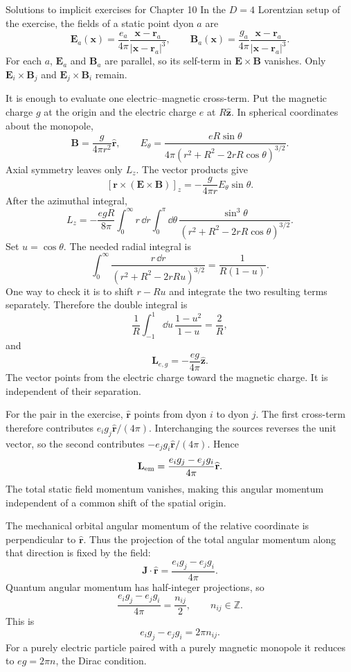 \begin{bankssolutions}{Solutions to implicit exercises for Chapter 10}
In the $D=4$ Lorentzian setup of the exercise, the fields of a static point
dyon $a$ are
\[
  \mathbf E_a(\mathbf x)=\frac{e_a}{4\pi}
  \frac{\mathbf x-\mathbf r_a}{|\mathbf x-\mathbf r_a|^3},
  \qquad
  \mathbf B_a(\mathbf x)=\frac{g_a}{4\pi}
  \frac{\mathbf x-\mathbf r_a}{|\mathbf x-\mathbf r_a|^3}.
\]
For each $a$, $\mathbf E_a$ and $\mathbf B_a$ are parallel, so its self-term
in $\mathbf E\times\mathbf B$ vanishes.  Only
$\mathbf E_i\times\mathbf B_j$ and
$\mathbf E_j\times\mathbf B_i$ remain.

It is enough to evaluate one electric--magnetic cross-term.  Put the magnetic
charge $g$ at the origin and the electric charge $e$ at
$R\widehat{\mathbf z}$.  In spherical coordinates about the monopole,
\[
  \mathbf B=\frac{g}{4\pi r^2}\widehat{\mathbf r},
  \qquad
  E_\theta=\frac{eR\sin\theta}{4\pi
  (r^2+R^2-2rR\cos\theta)^{3/2}}.
\]
Axial symmetry leaves only $L_z$.  The vector products give
\[
  [\mathbf r\times(\mathbf E\times\mathbf B)]_z
  =-\frac{g}{4\pi r}E_\theta\sin\theta.
\]
After the azimuthal integral,
\[
  L_z=-\frac{egR}{8\pi}
  \int_0^\infty r\,\dd r\int_0^\pi\dd\theta\,
  \frac{\sin^3\theta}
  {(r^2+R^2-2rR\cos\theta)^{3/2}}.
\]
Set $u=\cos\theta$.  The needed radial integral is
\[
  \int_0^\infty
  \frac{r\,\dd r}{(r^2+R^2-2rRu)^{3/2}}
  =\frac1{R(1-u)}.
\]
One way to check it is to shift $r-Ru$ and integrate the two resulting
terms separately.  Therefore the double integral is
\[
  \frac1R\int_{-1}^{1}\dd u\,
  \frac{1-u^2}{1-u}=\frac2R,
\]
and
\[
  \mathbf L_{e,g}=-\frac{eg}{4\pi}\widehat{\mathbf z}.
\]
The vector points from the electric charge toward the magnetic charge.  It is
independent of their separation.

For the pair in the exercise,
$\widehat{\mathbf r}$ points from dyon $i$ to dyon $j$.  The first cross-term
therefore contributes $e_i g_j\widehat{\mathbf r}/(4\pi)$.  Interchanging the
sources reverses the unit vector, so the second contributes
$-e_jg_i\widehat{\mathbf r}/(4\pi)$.  Hence
\[
  \mathbf L_{\rm em}
  =\frac{e_i g_j-e_jg_i}{4\pi}\widehat{\mathbf r}.
\]
The total static field momentum vanishes, making this angular momentum
independent of a common shift of the spatial origin.

The mechanical orbital angular momentum of the relative coordinate is
perpendicular to $\widehat{\mathbf r}$.  Thus the projection of the total
angular momentum along that direction is fixed by the field:
\[
  \mathbf J\cdot\widehat{\mathbf r}
  =\frac{e_i g_j-e_jg_i}{4\pi}.
\]
Quantum angular momentum has half-integer projections, so
\[
  \frac{e_i g_j-e_jg_i}{4\pi}=\frac{n_{ij}}2,
  \qquad n_{ij}\in\mathbb Z.
\]
This is
\[
  e_i g_j-e_jg_i=2\pi n_{ij}.
\]
For a purely electric particle paired with a purely magnetic monopole it
reduces to $eg=2\pi n$, the Dirac condition.

\end{bankssolutions}
